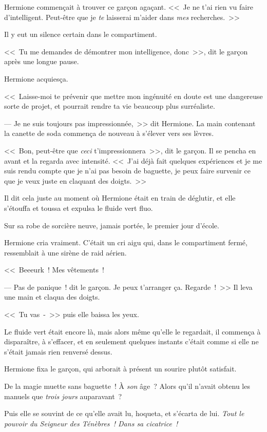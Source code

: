 Hermione commençait à trouver ce garçon agaçant. <<~Je ne t'ai rien vu faire d'intelligent. Peut-être que je \emph{te} laisserai m'aider dans \emph{mes} recherches.~>>

Il y eut un silence certain dans le compartiment.

<<~Tu me demandes de démontrer mon intelligence, donc~>>, dit le garçon après une longue pause.

Hermione acquiesça.

<<~Laisse-moi te prévenir que mettre mon ingénuité en doute est une dangereuse sorte de projet, et pourrait rendre ta vie beaucoup plus surréaliste.

--- Je ne suis toujours pas impressionnée,~>> dit Hermione. La main contenant la canette de soda commença de nouveau à s'élever vers ses lèvres.

<<~Bon, peut-être que \emph{ceci} t'impressionnera~>>, dit le garçon. Il se pencha en avant et la regarda avec intensité. <<~J'ai déjà fait quelques expériences et je me suis rendu compte que je n'ai pas besoin de baguette, je peux faire survenir ce que je veux juste en claquant des doigts.~>>

Il dit cela juste au moment où Hermione était en train de déglutir, et elle s'étouffa et toussa et expulsa le fluide vert fluo.

Sur sa robe de sorcière neuve, jamais portée, le premier jour d'école.

Hermione cria vraiment. C'était un cri aigu qui, dans le compartiment fermé, ressemblait à une sirène de raid aérien.

<<~Beeeurk~! Mes vêtements~!

--- Pas de panique~! dit le garçon. Je peux t'arranger ça. Regarde~!~>> Il leva une main et claqua des doigts.

<<~Tu vas~-~>> puis elle baissa les yeux.

Le fluide vert était encore là, mais alors même qu'elle le regardait, il commença à disparaître, à s'effacer, et en seulement quelques instants c'était comme si elle ne s'était jamais rien renversé dessus.

Hermione fixa le garçon, qui arborait à présent un sourire plutôt satisfait.

De la magie muette sans baguette~! À \emph{son} âge~? Alors qu'il n'avait obtenu les manuels que \emph{trois jours} auparavant~?

Puis elle se souvint de ce qu'elle avait lu, hoqueta, et s'écarta de lui. \emph{Tout le pouvoir du Seigneur des Ténèbres~! Dans sa cicatrice~!}

